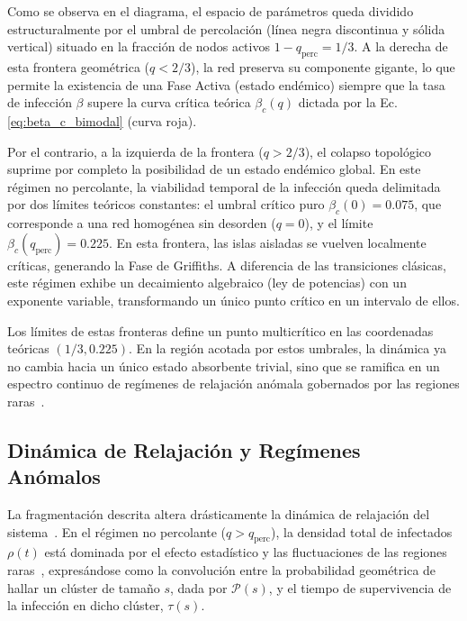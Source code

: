 \documentclass[%
reprint,
amsmath,amssymb,
aps,
]{revtex4-2}
\begin{document}
	Como se observa en el diagrama, el espacio de parámetros queda dividido estructuralmente por el umbral de percolación (línea negra discontinua y sólida vertical) situado en la fracción de nodos activos $1 - q_{\text{perc}} = 1/3$. A la derecha de esta frontera geométrica ($q < 2/3$), la red preserva su componente gigante, lo que permite la existencia de una Fase Activa (estado endémico) siempre que la tasa de infección $\beta$ supere la curva crítica teórica $\beta_c(q)$ dictada por la Ec. \ref{eq:beta_c_bimodal} (curva roja).
	
	Por el contrario, a la izquierda de la frontera ($q > 2/3$), el colapso topológico suprime por completo la posibilidad de un estado endémico global. En este régimen no percolante, la viabilidad temporal de la infección queda delimitada por dos límites teóricos constantes: el umbral crítico puro $\beta_c(0) = 0.075$, que corresponde a una red homogénea sin desorden ($q=0$), y el límite $\beta_c(q_{\text{perc}}) = 0.225$. En esta frontera, las islas aisladas se vuelven localmente críticas, generando la Fase de Griffiths. A diferencia de las transiciones clásicas, este régimen exhibe un decaimiento algebraico (ley de potencias) con un exponente variable, transformando un único punto crítico en un intervalo de ellos.
	
	Los límites de estas fronteras define un punto multicrítico en las coordenadas teóricas $(1/3, 0.225)$. En la región acotada por estos umbrales, la dinámica ya no cambia hacia un único estado absorbente trivial, sino que se ramifica en un espectro continuo de regímenes de relajación anómala gobernados por las regiones raras~\cite{Muñoz2010}.
	
	\subsection{Dinámica de Relajación y Regímenes Anómalos}
	
	La fragmentación descrita altera drásticamente la dinámica de relajación del sistema~\cite{Muñoz2010,Noest1986,Odor2004}. En el régimen no percolante ($q > q_{\text{perc}}$), la densidad total de infectados $\rho(t)$ está dominada por el efecto estadístico y las fluctuaciones de las regiones raras~\cite{Muñoz2010,Noest1986,Bray1987,Vojta_2006}, expresándose como la convolución entre la probabilidad geométrica de hallar un clúster de tamaño $s$, dada por $\mathcal{P}(s)$, y el tiempo de supervivencia de la infección en dicho clúster, $\tau(s)$.
	
\end{document}
